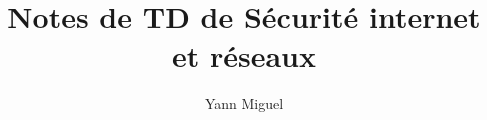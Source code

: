 \documentclass[a4paper, 12pt]{article}
\title{Notes de TD de S\'ecurit\'e internet et r\'eseaux}
\author{Yann Miguel}
\begin{document}
\ttfamily
\maketitle
\tableofcontents
\newpage


\end{document}
